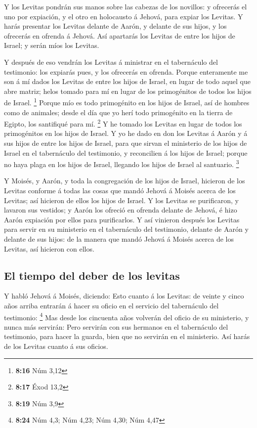  Y los Levitas pondrán sus manos sobre las cabezas de los
novillos: y ofrecerás el uno por expiación, y el otro en holocausto á
Jehová, para expiar los Levitas.  Y harás presentar los
Levitas delante de Aarón, y delante de sus hijos, y los ofrecerás en
ofrenda á Jehová.  Así apartarás los Levitas de entre los
hijos de Israel; y serán míos los Levitas.

 Y después de eso vendrán los Levitas á ministrar en el
tabernáculo del testimonio: los expiarás pues, y los ofrecerás en
ofrenda.  Porque enteramente me son á mí dados los Levitas
de entre los hijos de Israel, en lugar de todo aquel que abre matriz;
helos tomado para mí en lugar de los primogénitos de todos los hijos de
Israel. \footnote{\textbf{8:16} Núm 3,12}  Porque mío es
todo primogénito en los hijos de Israel, así de hombres como de
animales; desde el día que yo herí todo primogénito en la tierra de
Egipto, los santifiqué para mí. \footnote{\textbf{8:17} Éxod 13,2}
 Y he tomado los Levitas en lugar de todos los primogénitos
en los hijos de Israel.  Y yo he dado en don los Levitas á
Aarón y á sus hijos de entre los hijos de Israel, para que sirvan el
ministerio de los hijos de Israel en el tabernáculo del testimonio, y
reconcilien á los hijos de Israel; porque no haya plaga en los hijos de
Israel, llegando los hijos de Israel al santuario. \footnote{\textbf{8:19}
  Núm 3,9}

 Y Moisés, y Aarón, y toda la congregación de los hijos de
Israel, hicieron de los Levitas conforme á todas las cosas que mandó
Jehová á Moisés acerca de los Levitas; así hicieron de ellos los hijos
de Israel.  Y los Levitas se purificaron, y lavaron sus
vestidos; y Aarón los ofreció en ofrenda delante de Jehová, é hizo Aarón
expiación por ellos para purificarlos.  Y así vinieron
después los Levitas para servir en su ministerio en el tabernáculo del
testimonio, delante de Aarón y delante de sus hijos: de la manera que
mandó Jehová á Moisés acerca de los Levitas, así hicieron con ellos.

\hypertarget{el-tiempo-del-deber-de-los-levitas}{%
\subsection{El tiempo del deber de los
levitas}\label{el-tiempo-del-deber-de-los-levitas}}

 Y habló Jehová á Moisés, diciendo:  Esto
cuanto á los Levitas: de veinte y cinco años arriba entrarán á hacer su
oficio en el servicio del tabernáculo del testimonio: \footnote{\textbf{8:24}
  Núm 4,3; Núm 4,23; Núm 4,30; Núm 4,47}  Mas desde los
cincuenta años volverán del oficio de su ministerio, y nunca más
servirán:  Pero servirán con sus hermanos en el tabernáculo
del testimonio, para hacer la guarda, bien que no servirán en el
ministerio. Así harás de los Levitas cuanto á sus oficios.

